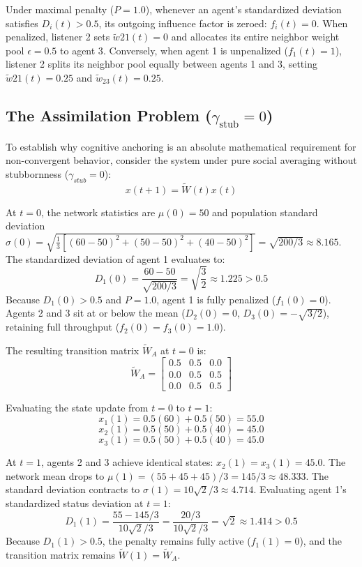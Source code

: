 Under maximal penalty ($P = 1.0$), whenever an agent's standardized deviation satisfies $D_i(t) > 0.5$, its outgoing influence factor is zeroed: $f_i(t) = 0$\cite{degroot1974reaching,acemoglu2013opinion}. When penalized, listener 2 sets $\tilde{w}{21}(t) = 0$ and allocates its entire neighbor weight pool $\epsilon = 0.5$ to agent 3\cite{degroot1974reaching}. Conversely, when agent 1 is unpenalized ($f_1(t) = 1$), listener 2 splits its neighbor pool equally between agents 1 and 3, setting $\tilde{w}{21}(t) = 0.25$ and $\tilde{w}_{23}(t) = 0.25$\cite{acemoglu2013opinion}.

\subsection{The Assimilation Problem ($\gamma_{\text{stub}} = 0$)}
To establish why cognitive anchoring is an absolute mathematical requirement for non-convergent behavior, consider the system under pure social averaging without stubbornness ($\gamma_{stub} = 0$)\cite{degroot1974reaching}: $$x(t+1) = \tilde{W}(t) x(t)$$

At $t = 0$, the network statistics are $\mu(0) = 50$ and population standard deviation $\sigma(0) = \sqrt{\frac{1}{3}[(60-50)^2 + (50-50)^2 + (40-50)^2]} = \sqrt{200/3} \approx 8.165$\cite{acemoglu2013opinion}. The standardized deviation of agent 1 evaluates to\cite{acemoglu2013opinion}: $$D_1(0) = \frac{60 - 50}{\sqrt{200/3}} = \sqrt{\frac{3}{2}} \approx 1.225 > 0.5$$ Because $D_1(0) > 0.5$ and $P = 1.0$, agent 1 is fully penalized ($f_1(0) = 0$)\cite{acemoglu2013opinion}. Agents 2 and 3 sit at or below the mean ($D_2(0) = 0$, $D_3(0) = -\sqrt{3/2}$), retaining full throughput ($f_2(0) = f_3(0) = 1.0$)\cite{acemoglu2013opinion}.

The resulting transition matrix $\tilde{W}_A$ at $t = 0$ is\cite{acemoglu2013opinion}: $$\tilde{W}_A = \begin{bmatrix} 0.5 & 0.5 & 0.0 \\ 0.0 & 0.5 & 0.5 \\ 0.0 & 0.5 & 0.5 \end{bmatrix}$$

Evaluating the state update from $t = 0$ to $t = 1$\cite{acemoglu2013opinion}: $$x_1(1) = 0.5(60) + 0.5(50) = 55.0$$ $$x_2(1) = 0.5(50) + 0.5(40) = 45.0$$ $$x_3(1) = 0.5(50) + 0.5(40) = 45.0$$

At $t = 1$, agents 2 and 3 achieve identical states: $x_2(1) = x_3(1) = 45.0$\cite{acemoglu2013opinion}. The network mean drops to $\mu(1) = (55 + 45 + 45)/3 = 145/3 \approx 48.333$\cite{acemoglu2013opinion}. The standard deviation contracts to $\sigma(1) = 10\sqrt{2}/3 \approx 4.714$\cite{acemoglu2013opinion}. Evaluating agent 1's standardized status deviation at $t = 1$\cite{acemoglu2013opinion}: $$D_1(1) = \frac{55 - 145/3}{10\sqrt{2}/3} = \frac{20/3}{10\sqrt{2}/3} = \sqrt{2} \approx 1.414 > 0.5$$ Because $D_1(1) > 0.5$, the penalty remains fully active ($f_1(1) = 0$), and the transition matrix remains $\tilde{W}(1) = \tilde{W}_A$\cite{acemoglu2013opinion}.

